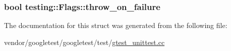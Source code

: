 \subsubsection[{\texorpdfstring{throw\+\_\+on\+\_\+failure}{throw_on_failure}}]{\setlength{\rightskip}{0pt plus 5cm}bool testing\+::\+Flags\+::throw\+\_\+on\+\_\+failure}\hypertarget{structtesting_1_1Flags_ab8e7d21e31e641efe47b8050759e001a}{}\label{structtesting_1_1Flags_ab8e7d21e31e641efe47b8050759e001a}


The documentation for this struct was generated from the following file\+:\begin{DoxyCompactItemize}
\item 
vendor/googletest/googletest/test/\hyperlink{gtest__unittest_8cc}{gtest\+\_\+unittest.\+cc}\end{DoxyCompactItemize}

